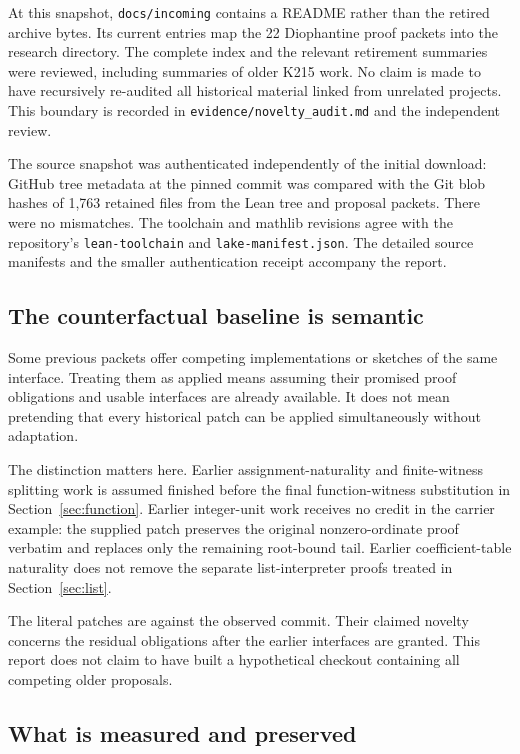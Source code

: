 \documentclass[11pt,letterpaper]{article}
\newcommand{\code}[1]{\nolinkurl{#1}}
\begin{document}
At this snapshot, \code{docs/incoming} contains a README rather than the retired archive bytes. Its current entries map the 22 Diophantine proof packets into the research directory. The complete index and the relevant retirement summaries were reviewed, including summaries of older K215 work. No claim is made to have recursively re-audited all historical material linked from unrelated projects. This boundary is recorded in \code{evidence/novelty_audit.md} and the independent review.

The source snapshot was authenticated independently of the initial download: GitHub tree metadata at the pinned commit was compared with the Git blob hashes of 1,763 retained files from the Lean tree and proposal packets. There were no mismatches. The toolchain and mathlib revisions agree with the repository's \code{lean-toolchain} and \code{lake-manifest.json}. The detailed source manifests and the smaller authentication receipt accompany the report.

\subsection{The counterfactual baseline is semantic}

Some previous packets offer competing implementations or sketches of the same interface. Treating them as applied means assuming their promised proof obligations and usable interfaces are already available. It does not mean pretending that every historical patch can be applied simultaneously without adaptation.

The distinction matters here. Earlier assignment-naturality and finite-witness splitting work is assumed finished before the final function-witness substitution in Section~\ref{sec:function}. Earlier integer-unit work receives no credit in the carrier example: the supplied patch preserves the original nonzero-ordinate proof verbatim and replaces only the remaining root-bound tail. Earlier coefficient-table naturality does not remove the separate list-interpreter proofs treated in Section~\ref{sec:list}.

The literal patches are against the observed commit. Their claimed novelty concerns the residual obligations after the earlier interfaces are granted. This report does not claim to have built a hypothetical checkout containing all competing older proposals.

\subsection{What is measured and preserved}
\end{document}
